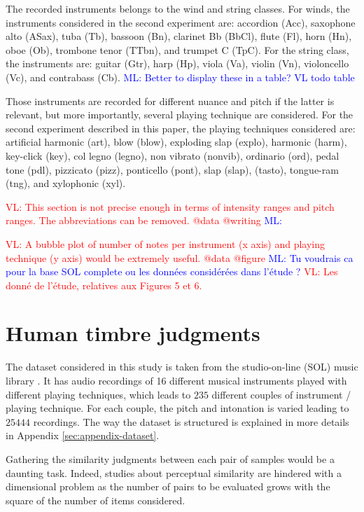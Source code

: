 \documentclass{bmcart}
\newcommand{\ml}[1]{\textcolor{blue}{ML: #1}}
\newcommand{\vl}[1]{\textcolor{red}{VL: #1}}
\begin{document}
\begin{backmatter}
The recorded instruments belongs to the wind and string classes.
For winds, the instruments considered in the second experiment are: accordion (Acc), saxophone alto (ASax), tuba (Tb), bassoon (Bn), clarinet Bb (BbCl), flute (Fl), horn (Hn), oboe (Ob), trombone tenor (TTbn), and trumpet C (TpC).
For the string class, the instruments are: guitar (Gtr), harp (Hp), viola (Va), violin (Vn), violoncello (Vc), and contrabass (Cb).
\ml{Better to display these in a table? VL todo table}

Those instruments are recorded for different nuance and pitch if the latter is relevant, but more importantly, several playing technique are considered.
For the second experiment described in this paper, the playing techniques considered are: artificial harmonic (art), blow (blow), exploding slap (explo), harmonic (harm), key-click (key), col legno (legno), non vibrato (nonvib), ordinario (ord), pedal tone (pdl), pizzicato (pizz), ponticello (pont), slap (slap), (tasto), tongue-ram (tng), and xylophonic (xyl).

\vl{This section is not precise enough in terms of intensity ranges and pitch ranges.
The abbreviations can be removed. @data @writing}
\ml{}

\vl{A bubble plot of number of notes per instrument (x axis) and playing technique
(y axis) would be extremely useful. @data @figure}
\ml{Tu voudrais ca pour la base SOL complete ou les données considérées dans l'étude ?}
\vl{Les donn\'{e} de l'\'{e}tude, relatives aux Figures 5 et 6.}

\section*{Human timbre judgments}
\label{sec:subjective}

The dataset considered in this study is taken
from the studio-on-line (SOL) music library  \cite{peeters2000instrument}.
It has audio recordings of 16 different musical instruments played
with different playing techniques,
which leads to $235$ different couples of instrument / playing technique.
For each couple, the pitch and intonation is varied leading to $25444$ recordings.
The way the dataset is structured
is explained in more details in Appendix \ref{sec:appendix-dataset}.

Gathering the similarity judgments between each pair of samples would be a daunting task. Indeed, studies about perceptual similarity are hindered with a dimensional problem as the number of pairs to be evaluated grows with the square of the number of items considered.


\end{backmatter}
\end{document}
